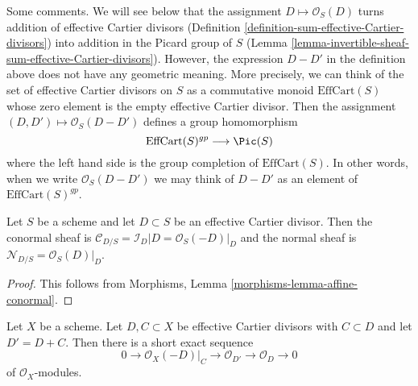 \noindent
Some comments. We will see below that the assignment
$D \mapsto \mathcal{O}_S(D)$ turns addition of effective Cartier
divisors (Definition \ref{definition-sum-effective-Cartier-divisors})
into addition in the Picard group of $S$
(Lemma \ref{lemma-invertible-sheaf-sum-effective-Cartier-divisors}).
However, the expression $D - D'$ in the definition above does not
have any geometric meaning. More precisely, we can think of the
set of effective Cartier divisors on $S$ as a commutative monoid
$\text{EffCart}(S)$ whose zero element is the empty effective Cartier divisor.
Then the assignment $(D, D') \mapsto \mathcal{O}_S(D - D')$ defines
a group homomorphism
$$
\text{EffCart}(S)^{gp} \longrightarrow \Pic(S)
$$
where the left hand side is the group completion of
$\text{EffCart}(S)$. In other words, when we write $\mathcal{O}_S(D - D')$
we may think of $D - D'$ as an element of $\text{EffCart}(S)^{gp}$.

\begin{lemma}
\label{lemma-conormal-effective-Cartier-divisor}
Let $S$ be a scheme and let $D \subset S$ be an effective Cartier divisor.
Then the conormal sheaf is $\mathcal{C}_{D/S} = \mathcal{I}_D|D =
\mathcal{O}_S(-D)|_D$ and the normal sheaf is
$\mathcal{N}_{D/S} = \mathcal{O}_S(D)|_D$.
\end{lemma}

\begin{proof}
This follows from Morphisms, Lemma \ref{morphisms-lemma-affine-conormal}.
\end{proof}

\begin{lemma}
\label{lemma-ses-add-divisor}
Let $X$ be a scheme. Let $D, C \subset X$ be
effective Cartier divisors with $C \subset D$ and let $D' = D + C$.
Then there is a short exact sequence
$$
0 \to \mathcal{O}_X(-D)|_C \to \mathcal{O}_{D'} \to \mathcal{O}_D \to 0
$$
of $\mathcal{O}_X$-modules.
\end{lemma}

